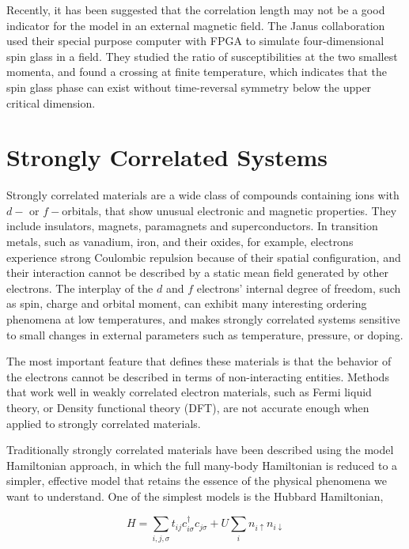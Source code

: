 Recently, it has been suggested that the correlation length may not be a 
good indicator for the model in an external magnetic field.
The Janus collaboration used their special purpose computer with FPGA to simulate
four-dimensional spin glass in a field. They studied the ratio of susceptibilities 
at the two smallest momenta, and found a crossing at finite temperature, which 
indicates that the spin glass phase can exist without time-reversal symmetry
below the upper critical dimension.



\section{Strongly Correlated Systems}
Strongly correlated materials are a wide class of compounds containing ions 
with $d-$ or $f-$orbitals, that show unusual electronic and magnetic properties. 
They include insulators, magnets, paramagnets and superconductors. In transition
metals, such as vanadium, iron, and their oxides, for example, electrons experience
strong Coulombic repulsion because of their spatial configuration, and their 
interaction cannot be described by a static mean field generated by other electrons.
The interplay of the $d$ and $f$ electrons' internal degree of freedom, such as
spin, charge and orbital moment, can exhibit many interesting ordering phenomena
at low temperatures, and makes strongly correlated systems sensitive to small
changes in external parameters such as temperature, pressure, or doping. 

The most important feature that defines these materials is that the behavior of the electrons
cannot be described in terms of non-interacting entities. Methods that work well
in weakly correlated electron materials, such as Fermi liquid theory, or Density
functional theory (DFT), are not accurate enough when applied to strongly 
correlated materials. 

Traditionally strongly correlated materials have been described using the model Hamiltonian 
approach, in which the full many-body Hamiltonian is reduced to a simpler, effective
model that retains the essence of the physical phenomena we want to understand.
One of the simplest models is the Hubbard Hamiltonian, 

\begin{equation}
  \label{eq:13}
  H=\sum_{i,j,\sigma}t_{ij}c_{i\sigma}^\dagger c_{j\sigma} + U\sum_i n_{i\uparrow} n_{i\downarrow}
\end{equation}

